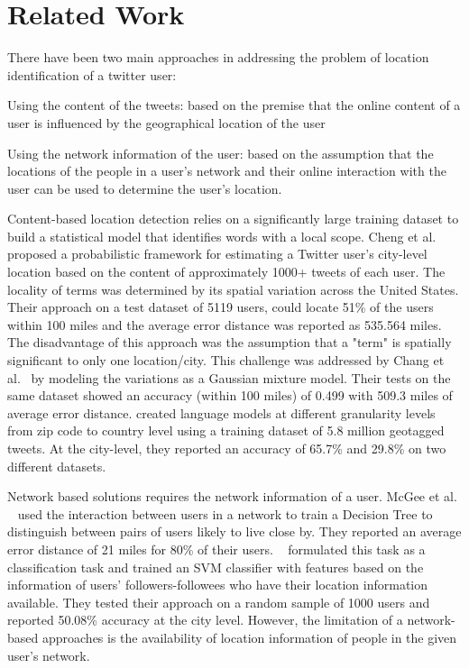 \section{Related Work}
\label{sec:RelatedWork}
There have been two main approaches in addressing the problem of location identification of a twitter user: \begin{inparaenum}[(1)] 
\item Using the content of the tweets: based on the premise that the online content of a user is influenced by the geographical location of the user
\item Using the network information of the user: based on the assumption that the locations of the people in a user's network and their online interaction with the user can be used to determine the user's location.
\end{inparaenum}

Content-based location detection relies on a significantly large training dataset to build a statistical model that identifies words with a local scope. Cheng et al. \cite{cheng2010you} proposed a probabilistic framework for estimating a Twitter user's city-level location based on the content of approximately 1000+ tweets of each user. The locality of terms was determined by its spatial variation across the United States. Their approach on a test dataset of 5119 users, could locate 51\% of the users within 100 miles and the average error distance was reported as 535.564 miles. The disadvantage of this approach was the assumption that a "term" is spatially significant to only one location/city. This challenge was addressed by Chang et al.~\cite{chang2012phillies} by modeling the variations as a Gaussian mixture model. Their tests on the same dataset showed an accuracy (within 100 miles) of 0.499 with 509.3 miles of average error distance.
\cite{ferrara2012web} created language models at different granularity levels from zip code to country level using a training dataset of 5.8 million geotagged tweets. At the city-level, they reported an accuracy of 65.7\% and 29.8\% on two different datasets.

Network based solutions requires the network information of a user. McGee et al. ~\cite{mcgee2013location} used the interaction between users in a network to train a Decision Tree to distinguish between pairs of users likely to live close by. They reported an average error distance of 21 miles for 80\% of their users. ~\cite{rout2013s} formulated this task as a classification task and trained an SVM classifier with features based on the information of users' followers-followees who have their location information available. They tested their approach on a random sample of 1000 users and reported 50.08\% accuracy at the city level. However, the limitation of a network-based approaches is the availability of location information of people in the given user's network.   

